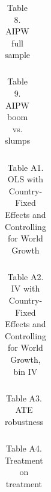 \documentclass[12pt]{article}
\begin{document}
\begin{table}[htbp]\centering
\def\sym#1{\ifmmode^{#1}\else\(^{#1}\)\fi}
\caption{Table 8. AIPW full sample}
\begin{tabular}{lcccccc}
    
\end{tabular}
\end{table}

\begin{table}[htbp]\centering
\def\sym#1{\ifmmode^{#1}\else\(^{#1}\)\fi}
\caption{Table 9. AIPW boom vs. slumps}
\begin{tabular}{lcccccc}
    
\end{tabular}
\end{table}

\begin{table}[htbp]\centering
\def\sym#1{\ifmmode^{#1}\else\(^{#1}\)\fi}
\caption{Table A1. OLS with Country-Fixed Effects and Controlling for World Growth}
\begin{tabular}{lcccccc}
    
\end{tabular}
\end{table}

\begin{table}[htbp]\centering
\def\sym#1{\ifmmode^{#1}\else\(^{#1}\)\fi}
\caption{Table A2. IV with Country-Fixed Effects and Controlling for World Growth, bin IV}
\begin{tabular}{lcccccc}
    
\end{tabular}
\end{table}

\begin{table}[htbp]\centering
\def\sym#1{\ifmmode^{#1}\else\(^{#1}\)\fi}
\caption{Table A3. ATE robustness}
\begin{tabular}{lccccc}
    
\end{tabular}
\end{table}

\begin{table}[htbp]\centering
\def\sym#1{\ifmmode^{#1}\else\(^{#1}\)\fi}
\caption{Table A4. Treatment on treatment}
\begin{tabular}{lccc}
    
\end{tabular}
\end{table}

\newpage
\end{document}
